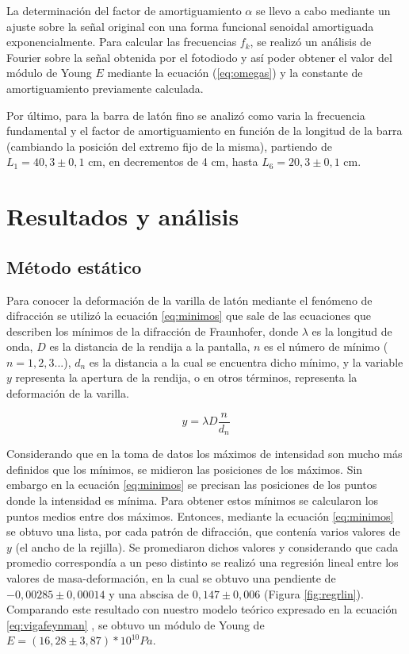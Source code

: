\documentclass[twoside,twocolumn,a4paper]{article}
\begin{document}
La determinaci\'on del factor de amortiguamiento $\alpha$ se llevo a cabo mediante un ajuste sobre la se\~nal original con una forma funcional senoidal amortiguada exponencialmente.
Para calcular las frecuencias $f_{k}$, se realiz\'o un an\'alisis de Fourier sobre la se\~nal obtenida por el fotodiodo y as\'i poder obtener el valor del m\'odulo de Young $E$ mediante la ecuaci\'on (\ref{eq:omegas}) y la constante de amortiguamiento previamente calculada.

Por \'ultimo, para la barra de lat\'on fino se analiz\'o como varia la frecuencia fundamental y el factor de amortiguamiento en funci\'on de la longitud de la barra (cambiando la posici\'on del extremo fijo de la misma), partiendo de $L_{1} = 40,3 \pm 0,1$ cm, en decrementos de 4 cm, hasta $L_{6} = 20,3 \pm 0,1$ cm.



\section{Resultados y an\'alisis}

\subsection{M\'etodo est\'atico}

Para conocer la deformaci\'on de la varilla de lat\'on mediante el fen\'omeno de difracci\'on se utiliz\'o la ecuaci\'on \ref{eq:minimos} que sale de las ecuaciones que describen los m\'inimos de la  difracci\'on de  Fraunhofer, donde $\lambda$  es la longitud de onda, $D$ es la distancia de la rendija a la pantalla, $n$ es el n\'umero de m\'inimo ($n = 1, 2, 3...$), $d_{n}$ es la distancia a la cual se encuentra dicho m\'inimo, y la variable $y$ representa la apertura de la rendija, o en otros t\'erminos, representa la deformaci\'on de la varilla.

\begin{equation}
\label{eq:minimos}
y= \lambda D \frac{n}{d_{n}}
\end{equation}

Considerando que en la toma de datos los m\'aximos de intensidad son mucho m\'as definidos que los m\'inimos, se midieron las posiciones de los m\'aximos. Sin embargo en la ecuaci\'on \ref{eq:minimos} se precisan las posiciones de los puntos donde la intensidad es m\'inima. Para obtener estos m\'inimos se calcularon los puntos medios entre dos m\'aximos. Entonces, mediante la ecuaci\'on \ref{eq:minimos} se obtuvo una lista, por cada patr\'on de difracci\'on, que conten\'ia varios valores de $y$ (el ancho de la rejilla). Se promediaron dichos valores y considerando que cada promedio correspond\'ia a un peso distinto se realiz\'o una regresi\'on lineal entre los valores de masa-deformaci\'on, en la cual se obtuvo una pendiente de $-0,00285 \pm 0,00014 $ y una abscisa de $0,147 \pm 0,006$ (Figura \ref{fig:regrlin}). Comparando este resultado con nuestro modelo te\'orico expresado en la ecuaci\'on \ref{eq:vigafeynman} , se obtuvo un m\'odulo de Young de $E = (16,28 \pm 3,87) * 10^{10} Pa$.
\end{document}
